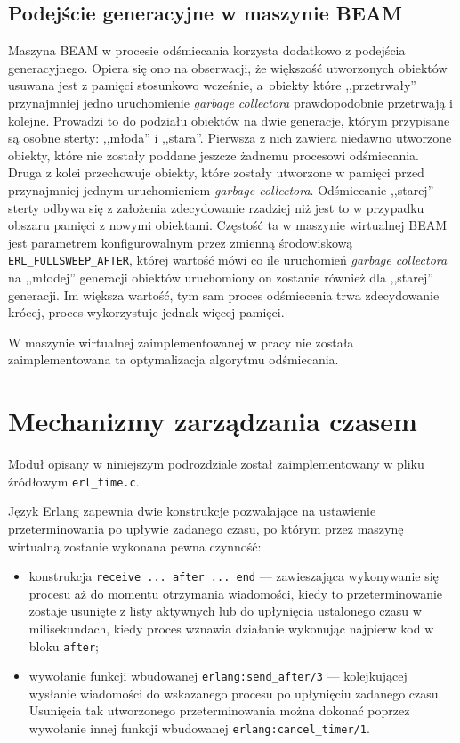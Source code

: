 \subsection{Podejście generacyjne w maszynie BEAM}
\label{sub:gcGeneracje}

Maszyna BEAM w procesie odśmiecania korzysta dodatkowo z podejścia generacyjnego.
Opiera się ono na obserwacji, że większość utworzonych obiektów usuwana jest z pamięci stosunkowo wcześnie, a~obiekty które ,,przetrwały'' przynajmniej jedno uruchomienie \emph{garbage collectora} prawdopodobnie przetrwają i kolejne.
Prowadzi to do podziału obiektów na dwie generacje, którym przypisane są osobne sterty: ,,młoda'' i ,,stara''.
Pierwsza z nich zawiera niedawno utworzone obiekty, które nie zostały poddane jeszcze żadnemu procesowi odśmiecania.
Druga z kolei przechowuje obiekty, które zostały utworzone w pamięci przed przynajmniej jednym uruchomieniem \emph{garbage collectora}.
Odśmiecanie ,,starej'' sterty odbywa się z założenia zdecydowanie rzadziej niż jest to w przypadku obszaru pamięci z nowymi obiektami.
Częstość ta w maszynie wirtualnej BEAM jest parametrem konfigurowalnym przez zmienną środowiskową \texttt{ERL\_FULLSWEEP\_AFTER}, której wartość mówi co ile uruchomień \emph{garbage collectora} na ,,młodej'' generacji obiektów uruchomiony on zostanie również dla ,,starej'' generacji.
Im większa wartość, tym sam proces odśmiecenia trwa zdecydowanie krócej, proces wykorzystuje jednak więcej pamięci.

W maszynie wirtualnej zaimplementowanej w pracy nie została zaimplementowana ta optymalizacja algorytmu odśmiecania. 


\section{Mechanizmy zarządzania czasem}
\label{sec:maszynaTimer}

Moduł opisany w niniejszym podrozdziale został zaimplementowany w pliku źródłowym \texttt{erl\_time.c}.

Język Erlang zapewnia dwie konstrukcje pozwalające na ustawienie przeterminowania po upływie zadanego czasu, po którym przez maszynę wirtualną zostanie wykonana pewna czynność:
\begin{itemize}
\item konstrukcja \texttt{receive ... after ... end} --- zawieszająca wykonywanie się procesu aż do momentu otrzymania wiadomości, kiedy to przeterminowanie zostaje usunięte z listy aktywnych lub do upłynięcia ustalonego czasu w milisekundach, kiedy proces wznawia działanie wykonując najpierw kod w bloku \texttt{after};
\item wywołanie funkcji wbudowanej \texttt{erlang:send\_after/3} --- kolejkującej wysłanie wiadomości do wskazanego procesu po upłynięciu zadanego czasu. Usunięcia tak utworzonego przeterminowania można dokonać poprzez wywołanie innej funkcji wbudowanej \texttt{erlang:cancel\_timer/1}.
\end{itemize}


